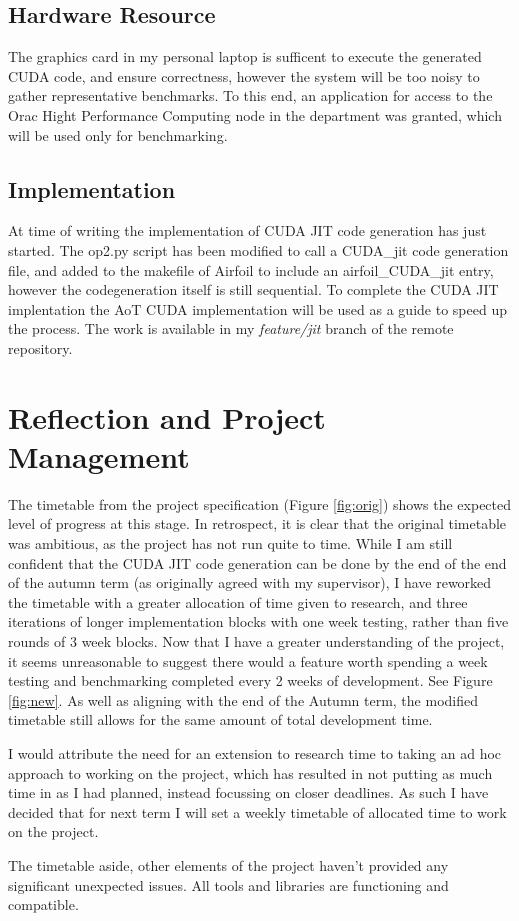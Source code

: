 \documentclass[11pt]{article}
\begin{document}
\subsection*{Hardware Resource}
The graphics card in my personal laptop is sufficent to execute the generated CUDA code, and ensure correctness, however the system will be too noisy to gather representative benchmarks. To this end, an application for access to the Orac Hight Performance Computing node in the department was granted, which will be used only for benchmarking.

\subsection*{Implementation}
At time of writing the implementation of CUDA JIT code generation has just started. The op2.py script has been modified to call a CUDA\_jit code generation file, and added to the makefile of Airfoil to include an airfoil\_CUDA\_jit entry, however the codegeneration itself is still sequential. To complete the CUDA JIT implentation the AoT CUDA implementation will be used as a guide to speed up the process. The work is available in my \textit{feature/jit} branch of the remote repository.

\section*{Reflection and Project Management}
The timetable from the project specification (Figure \ref{fig:orig}) shows the expected level of progress at this stage. In retrospect, it is clear that the original timetable was ambitious, as the project has not run quite to time. While I am still confident that the CUDA JIT code generation can be done by the end of the end of the autumn term (as originally agreed with my supervisor), I have reworked the timetable with a greater allocation of time given to research, and three iterations of longer implementation blocks with one week testing, rather than five rounds of 3 week blocks. Now that I have a greater understanding of the project, it seems unreasonable to suggest there would a feature worth spending a week testing and benchmarking completed every 2 weeks of development. See Figure \ref{fig:new}. As well as aligning with the end of the Autumn term, the modified timetable still allows for the same amount of total development time.
\par I would attribute the need for an extension to research time to taking an ad hoc approach to working on the project, which has resulted in not putting as much time in as I had planned, instead focussing on closer deadlines. As such I have decided that for next term I will set a weekly timetable of allocated time to work on the project.
\par The timetable aside, other elements of the project haven't provided any significant unexpected issues. All tools and libraries are functioning and compatible.
\end{document}
